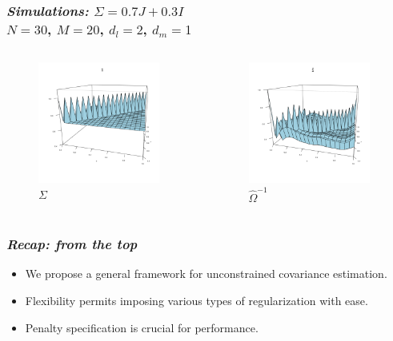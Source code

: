\documentclass[12pt]{beamer}
\begin{document}
\begin{frame}
\frametitle{\emph{Simulations: }$\Sigma = 0.7J + 0.3I$\\
$N = 30$, $M=20$, $d_l = 2$, $d_m= 1$}

 \begin{columns}
\begin{column}{0.5\textwidth}
    \begin{center}
    \begin{figure}
    \graphicspath{{img/}}
 \includegraphics[width=4cm]{compound-symmetry-true-covariance}
 \caption{$\Sigma$ }
 \end{figure}
     \end{center}
  \end{column}
\begin{column}{0.5\textwidth}  %
    \begin{center}
    \begin{figure}
    \graphicspath{{img/}}
 \includegraphics[width=4cm]{compound-symmetry-estimated-covariance}
 \caption{$\hat{\Omega}^{-1}$}
 \end{figure}
     \end{center}
\end{column}
\end{columns}


\end{frame}



\begin{frame}
\frametitle{\emph{Recap: from the top}}

\begin{itemize}
\item We propose a general framework for unconstrained covariance estimation.
\item Flexibility permits imposing various types of regularization with ease. 
\item Penalty specification is crucial for performance.
\end{itemize}

\end{frame}
\end{document}
